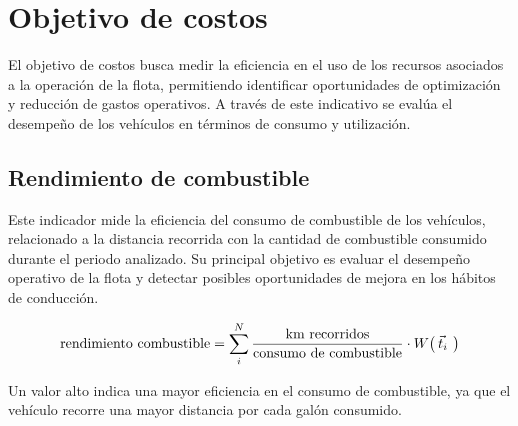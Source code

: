 \section{Objetivo de costos}

El objetivo de costos busca medir la eficiencia en el uso de los recursos asociados a la operación de la flota, permitiendo identificar oportunidades de optimización y reducción de gastos operativos. A través de este indicativo se evalúa el desempeño de los vehículos en términos de consumo y utilización.

\subsection{Rendimiento de combustible}

Este indicador mide la eficiencia del consumo de combustible de los vehículos, relacionado a la distancia recorrida con la cantidad de combustible consumido durante el periodo analizado. Su principal objetivo es evaluar el desempeño operativo de la flota y detectar posibles oportunidades de mejora en los hábitos de conducción.

\begin{equation*}
    \text{rendimiento combustible} = \sum_i^N \frac{\text{km recorridos}}{\text{consumo de combustible}} \cdot W\big( \hspace{0.07cm} \smash{\vec{t}_i}\,\vphantom{t} \hspace{0.07cm} \big)
\end{equation*}

Un valor alto indica una mayor eficiencia en el consumo de combustible, ya que el vehículo recorre una mayor distancia por cada galón consumido.
